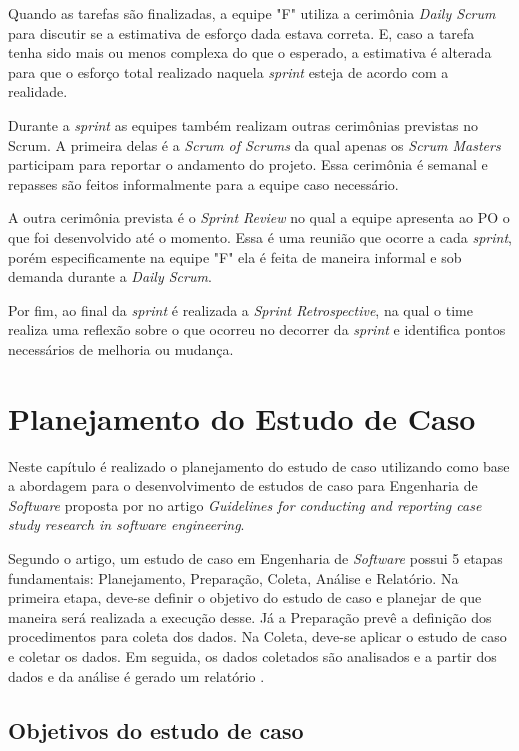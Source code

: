\documentclass[
    12pt,       %
    openright,      %
    twoside,      %
    a4paper,      %
    english,      %
    french,       %
    spanish,      %
    brazil,       %
    ]{abntex2}
\begin{document}
Quando as tarefas são finalizadas, a equipe "F" utiliza a cerimônia \textit{Daily Scrum} para discutir se a estimativa de esforço dada estava correta. E, caso a tarefa tenha sido mais ou menos complexa do que o esperado, a estimativa é alterada para que o esforço total realizado naquela \textit{sprint} esteja de acordo com a realidade.

Durante a \textit{sprint} as equipes também realizam outras cerimônias previstas no Scrum. A primeira delas é a \textit{Scrum of Scrums} da qual apenas os \textit{Scrum Masters} participam para reportar o andamento do projeto. Essa cerimônia é semanal e repasses são feitos informalmente para a equipe caso necessário.

A outra cerimônia prevista é o \textit{Sprint Review} no qual a equipe apresenta ao PO o que foi desenvolvido até o momento. Essa é uma reunião que ocorre a cada \textit{sprint}, porém especificamente na equipe "F" ela é feita de maneira informal e sob demanda durante a \textit{Daily Scrum}.

Por fim, ao final da \textit{sprint} é realizada a \textit{Sprint Retrospective}, na qual o time realiza uma reflexão sobre o que ocorreu no decorrer da \textit{sprint} e identifica pontos necessários de melhoria ou mudança.


\chapter{Planejamento do Estudo de Caso}
\label{sec:Proposta}

Neste capítulo é realizado o planejamento do estudo de caso utilizando como base a abordagem para o desenvolvimento de estudos de caso para Engenharia de \textit{Software} proposta por  no artigo \textit{Guidelines for conducting and reporting case study research in software engineering}.

Segundo o artigo, um estudo de caso em Engenharia de \textit{Software} possui 5 etapas fundamentais: Planejamento, Preparação, Coleta, Análise e Relatório. Na primeira etapa, deve-se definir o objetivo do estudo de caso e planejar de que maneira será realizada a execução desse. Já a Preparação prevê a definição dos procedimentos para coleta dos dados. Na Coleta, deve-se aplicar o estudo de caso e coletar os dados. Em seguida, os dados coletados são analisados e a partir dos dados e da análise é gerado um relatório \cite{RUNESON:2009}.

\section{Objetivos do estudo de caso}
\end{document}
